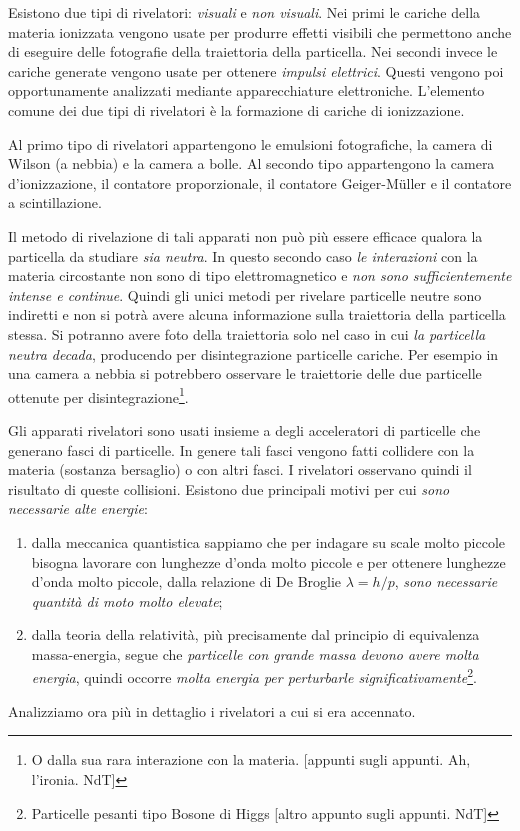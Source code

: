 Esistono due tipi di rivelatori: \textit{visuali} e \textit{non visuali}. Nei
primi le cariche della materia ionizzata vengono usate per produrre effetti
visibili che permettono anche di eseguire delle fotografie della traiettoria
della particella. Nei secondi invece le cariche generate vengono usate per
ottenere \textit{impulsi elettrici}. Questi vengono poi opportunamente
analizzati mediante apparecchiature elettroniche. L'elemento comune dei due
tipi di rivelatori è la formazione di cariche di ionizzazione.

Al primo tipo di rivelatori appartengono le emulsioni fotografiche, la camera
di Wilson (a nebbia) e la camera a bolle. Al secondo tipo appartengono la
camera d'ionizzazione, il contatore proporzionale, il contatore Geiger-M\"uller
e il contatore a scintillazione.

Il metodo di rivelazione di tali apparati non può più essere efficace qualora
la particella da studiare \textit{sia neutra}. In questo secondo caso
\textit{le interazioni} con la materia circostante non sono di tipo
elettromagnetico e \textit{non sono sufficientemente intense e continue}.
Quindi gli unici metodi per rivelare particelle neutre sono indiretti e non si
potrà avere alcuna informazione sulla traiettoria della particella stessa. Si
potranno avere foto della traiettoria solo nel caso in cui
\textit{la particella neutra decada}, producendo per disintegrazione particelle
cariche. Per esempio in una camera a nebbia si potrebbero osservare le
traiettorie delle due particelle ottenute per
disintegrazione\footnote{O dalla sua rara interazione con la materia. [appunti
sugli appunti. Ah, l'ironia. NdT]}.

Gli apparati rivelatori sono usati insieme a degli acceleratori di particelle
che generano fasci di particelle. In genere tali fasci vengono fatti collidere
con la materia (sostanza bersaglio) o con altri fasci. I rivelatori osservano
quindi il risultato di queste collisioni. Esistono due principali motivi per
cui \textit{sono necessarie alte energie}:
\begin{enumerate}
 \item dalla meccanica quantistica sappiamo che per indagare su scale molto piccole bisogna lavorare con lunghezze d'onda molto piccole e per ottenere lunghezze d'onda molto piccole, dalla relazione di De Broglie $\lambda = h/p$, \textit{sono necessarie quantità di moto molto elevate};
 \item dalla teoria della relatività, più precisamente dal principio di equivalenza massa-energia, segue che \textit{particelle con grande massa devono avere molta energia}, quindi occorre \textit{molta energia per perturbarle significativamente}\footnote{Particelle pesanti tipo Bosone di Higgs [altro appunto sugli appunti. NdT]}.
\end{enumerate}
Analizziamo ora più in dettaglio i rivelatori a cui si era accennato.
